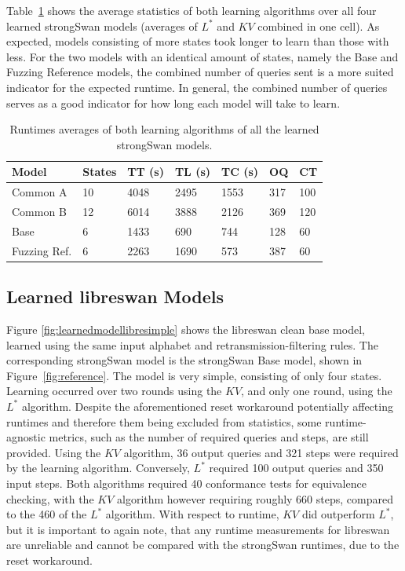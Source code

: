 Table~\ref{tab:runtime_summary_averages} shows the average statistics of both learning algorithms over all four learned strongSwan models (averages of $L^*$ and $KV$ combined in one cell). As expected, models consisting of more states took longer to learn than those with less. For the two models with an identical amount of states, namely the Base and Fuzzing Reference models, the combined number of queries sent is a more suited indicator for the expected runtime. In general, the combined number of queries serves as a good indicator for how long each model will take to learn. 

\begin{table}[h]
	\centering
	\begin{tabular}{|l|l|l|l|l|l|l|}
		\hline
		\rowcolor[HTML]{C0C0C0} 
		Model    	& States & TT (s)   & TL (s)   	  & TC (s)   & OQ  & CT  \\ \hline
		Common A  	& 10     & 4048 	  & 2495	 	  & 1553 	 & 317 & 100 \\ \hline
		Common B  	& 12     & 6014 	  & 3888		  & 2126 	 & 369 & 120 \\ \hline
		Base      	& 6      & 1433 	  & 690 		  & 744  	 & 128 & 60  \\ \hline
		Fuzzing Ref.& 6      & 2263 	  & 1690		  & 573  	 & 387 & 60  \\ \hline
	\end{tabular}
	\caption{Runtimes averages of both learning algorithms of all the learned strongSwan models.}
	\label{tab:runtime_summary_averages}
\end{table}

\subsection{Learned libreswan Models}
Figure \ref{fig:learnedmodellibresimple} shows the libreswan clean base model, learned using the same input alphabet and retransmission-filtering rules. The corresponding strongSwan model is the strongSwan Base model, shown in Figure~\ref{fig:reference}. The model is very simple, consisting of only four states. Learning occurred over two rounds using the $KV$, and only one round, using the $L^*$ algorithm. Despite the aforementioned reset workaround potentially affecting runtimes and therefore them being excluded from statistics, some runtime-agnostic metrics, such as the number of required queries and steps, are still provided. Using the $KV$ algorithm, 36 output queries and 321 steps were required by the learning algorithm. Conversely, $L^*$ required 100 output queries and 350 input steps. Both algorithms required 40 conformance tests for equivalence checking, with the $KV$ algorithm however requiring roughly 660 steps, compared to the 460 of the $L^*$ algorithm. With respect to runtime, $KV$ did outperform $L^*$, but it is important to again note, that any runtime measurements for libreswan are unreliable and cannot be compared with the strongSwan runtimes, due to the reset workaround.

